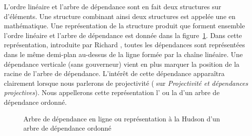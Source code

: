 L’ordre linéaire et l’arbre de dépendance sont en fait deux structures sur  d’éléments.  Une structure combinant ainsi deux structures est appelée une  en mathématique.
Une représentation de la structure produit que forment ensemble l’ordre linéaire et l’arbre de dépendance est donnée dans la figure~\ref{fig:noel-Hudson}. Dans cette représentation, introduite par Richard \citet{hudson1984word}, toutes les dépendances sont représentées dans le même demi-plan au-dessus de la ligne formée par la chaîne linéaire. Une dépendance verticale (sans gouverneur) vient en plus marquer la position de la racine de l'arbre de dépendance. L’intérêt de cette dépendance apparaîtra clairement lorsque nous parlerons de projectivité ( sur \textit{Projectivité et dépendances projectives}). Nous appellerons cette représentation l' ou la   d'un arbre de dépendance ordonné.

\vfill
\begin{figure}[H]
\caption{Arbre de dépendance en ligne ou représentation à la Hudson d'un arbre de dépendance ordonné\label{fig:noel-Hudson}}
\end{figure}
\vfill
\pagebreak




